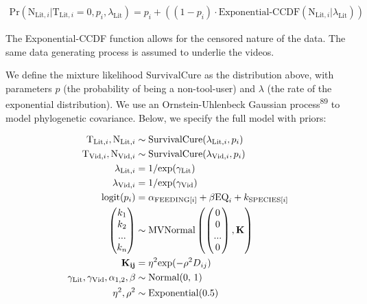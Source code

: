 \documentclass[
  man, donotrepeattitle,floatsintext]{apa6}
\begin{document}
\begin{align}
\text{Pr}(\text{N}_{\text{Lit},i}|\text{T}_{\text{Lit},i} = 0,p_i,\lambda_\text{Lit}) = p_i + ((1-p_i)\cdot\text{Exponential-CCDF}(\text{N}_{\text{Lit},i}|\lambda_\text{Lit}))
\end{align}

The Exponential-CCDF function allows for the censored nature of the data. The
same data generating process is assumed to underlie the videos.

We define the mixture likelihood \(\text{SurvivalCure}\) as the distribution
above, with parameters \(p\) (the probability of being a non-tool-user)
and \(\lambda\) (the rate of the exponential distribution). We use an
Ornstein-Uhlenbeck Gaussian process\textsuperscript{89} to model phylogenetic
covariance. Below, we specify the full model with priors:

\begin{align}
\text{T}_{\text{Lit},i}, \text{N}_{\text{Lit},i} &\sim \text{SurvivalCure}(\lambda_{\text{Lit},i}, p_{i}) \\
\text{T}_{\text{Vid},i}, \text{N}_{\text{Vid},i} &\sim \text{SurvivalCure}(\lambda_{\text{Vid},i}, p_{i}) \nonumber \\
\lambda_{\text{Lit},i} &= 1 / \text{exp}(\gamma_\text{Lit}) \nonumber \\
\lambda_{\text{Vid},i} &= 1 / \text{exp}(\gamma_\text{Vid}) \nonumber \\
\text{logit}(p_{i}) &= \alpha_{\text{FEEDING}[i]} + \beta\text{EQ}_{i} +  k_{\text{SPECIES}[i]} \nonumber \\
\begin{pmatrix}k_{1}\\k_{2}\\...\\k_{n}\\\end{pmatrix}
&\sim \text{MVNormal}
\begin{pmatrix}\begin{pmatrix}0\\0\\...\\0\\\end{pmatrix},\bf{K}\end{pmatrix} \nonumber \\
\bf{K}_{ij} &= \eta^2\text{exp}(-\rho^2D_{ij}) \nonumber \\
\gamma_\text{Lit}, \gamma_\text{Vid}, \alpha_{1,2}, \beta &\sim \text{Normal(0, 1)} \nonumber \\
\eta^2, \rho^2 &\sim \text{Exponential(0.5)} \nonumber
\end{align}
\end{document}
